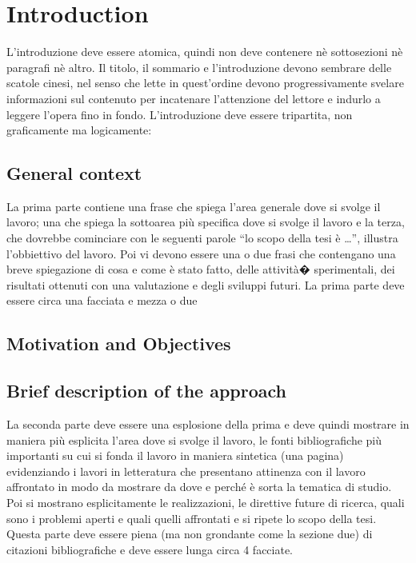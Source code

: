 \chapter{Introduction}
\label{Introduzione}
\thispagestyle{empty}



\noindent L'introduzione deve essere atomica, quindi non deve contenere n\`e sottosezioni n\`e 
paragrafi n\`e altro. Il titolo, il sommario e l'introduzione devono sembrare delle scatole cinesi, 
nel senso che lette in quest'ordine devono progressivamente svelare informazioni sul contenuto per 
incatenare l'attenzione del lettore e indurlo a leggere l'opera fino in fondo. L'introduzione deve 
essere tripartita, non graficamente ma logicamente:

\section{General context}
La prima parte contiene una frase che spiega l'area generale dove si svolge il lavoro; una che spiega 
la sottoarea pi\`u specifica dove si svolge il lavoro e la terza, che dovrebbe cominciare con le 
seguenti parole ``lo scopo della tesi \`e \dots'', illustra l'obbiettivo del lavoro. Poi vi devono 
essere una o due frasi che contengano una breve spiegazione di cosa e come \`e stato fatto, delle 
attivit\`a� sperimentali, dei risultati ottenuti con una valutazione e degli sviluppi futuri. La prima 
parte deve essere circa una facciata e mezza o due

\section{Motivation and Objectives}

\section{Brief description of the approach}
La seconda parte deve essere una esplosione della prima e deve quindi mostrare in maniera pi\`u esplicita l'area dove si svolge il lavoro, le fonti bibliografiche pi\`u importanti su cui si fonda il lavoro in maniera sintetica (una pagina) evidenziando i lavori in letteratura che presentano attinenza con il lavoro affrontato in modo da mostrare da dove e perch\'e \`e sorta la tematica di studio. Poi si mostrano esplicitamente le realizzazioni, le direttive future di ricerca, quali sono i problemi aperti e quali quelli affrontati e si ripete lo scopo della tesi. Questa parte deve essere piena (ma non grondante come la sezione due) di citazioni bibliografiche e deve essere lunga circa 4 facciate.




